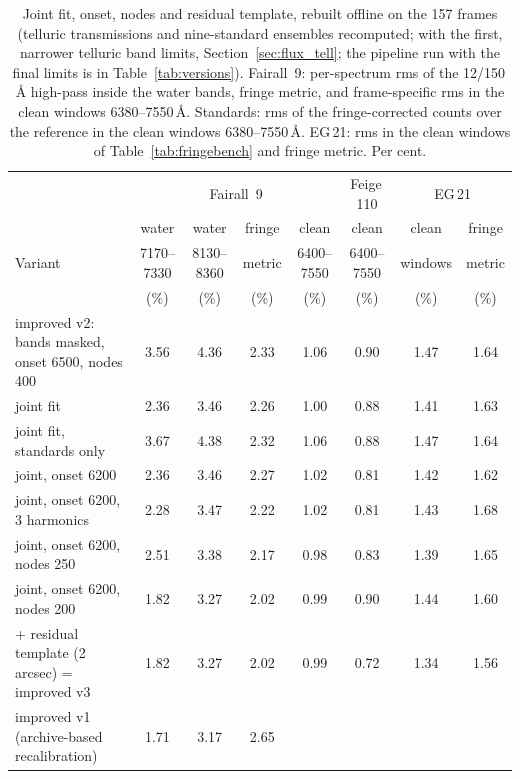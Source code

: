 \begin{table}[!htbp]
\centering
\small
\caption{Joint fit, onset, nodes and residual template, rebuilt offline on the 157 frames (telluric transmissions
and nine-standard ensembles recomputed; with the first, narrower telluric band limits, Section~\ref{sec:flux_tell};
the pipeline run with the final limits is in Table~\ref{tab:versions}). Fairall~9: per-spectrum rms of the 12/150\,\AA{} high-pass inside the water
bands, fringe metric, and frame-specific rms in the clean windows 6380--7550\,\AA. Standards: rms of the
fringe-corrected counts over the reference in the clean windows 6380--7550\,\AA. EG\,21: rms in the clean windows of
Table~\ref{tab:fringebench} and fringe metric. Per cent.}
\label{tab:fringejoint}
\setlength{\tabcolsep}{4pt}
\begin{tabular}{@{}>{\raggedright\arraybackslash}p{5.0cm}cccc|c|cc@{}}
\toprule
 & \multicolumn{4}{c|}{Fairall~9} & Feige\,110 & \multicolumn{2}{c}{EG\,21} \\
 & water & water & fringe & clean & clean & clean & fringe \\
Variant & 7170--7330 & 8130--8360 & metric & 6400--7550 & 6400--7550 & windows & metric \\
 & (\%) & (\%) & (\%) & (\%) & (\%) & (\%) & (\%) \\
\midrule
improved v2: bands masked, onset 6500, nodes 400 & 3.56 & 4.36 & 2.33 & 1.06 & 0.90 & 1.47 & 1.64 \\
joint fit & 2.36 & 3.46 & 2.26 & 1.00 & 0.88 & 1.41 & 1.63 \\
joint fit, standards only & 3.67 & 4.38 & 2.32 & 1.06 & 0.88 & 1.47 & 1.64 \\
joint, onset 6200 & 2.36 & 3.46 & 2.27 & 1.02 & 0.81 & 1.42 & 1.62 \\
joint, onset 6200, 3 harmonics & 2.28 & 3.47 & 2.22 & 1.02 & 0.81 & 1.43 & 1.68 \\
joint, onset 6200, nodes 250 & 2.51 & 3.38 & 2.17 & 0.98 & 0.83 & 1.39 & 1.65 \\
joint, onset 6200, nodes 200 & 1.82 & 3.27 & 2.02 & 0.99 & 0.90 & 1.44 & 1.60 \\
\quad + residual template (2\,arcsec) = improved v3 & 1.82 & 3.27 & 2.02 & 0.99 & 0.72 & 1.34 & 1.56 \\
\midrule
improved v1 (archive-based recalibration) & 1.71 & 3.17 & 2.65 & & & & \\
\bottomrule
\end{tabular}
\end{table}

